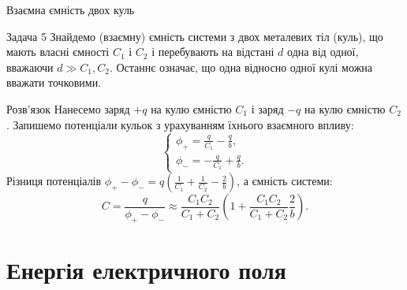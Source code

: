\documentclass[onlytextwidth]{beamer}
\begin{document}
\begin{frame}{Взаємна ємність двох куль}{}
	\begin{exampleblock}{\scriptsize Задача 5}\scriptsize\justifying
		Знайдемо (взаємну) ємність системи з двох металевих тіл (куль), що мають власні ємності
		$C_1$ і $C_2$ і перебувають на відстані $d$ одна від одної, вважаючи $d \gg C_1,C_2$.
		Останнє означає, що одна відносно одної кулі можна вважати точковими.
	\end{exampleblock}
	\begin{center}
	\end{center}
	\begin{block}{\scriptsize Розв'язок}\scriptsize\justifying
		Нанесемо заряд $+q$ на кулю ємністю $C_1$ і заряд $-q$ на кулю ємністю $C_2$. Запишемо
		потенціали кульок з урахуванням їхнього взаємного впливу:
		\begin{equation*}
			\begin{cases}
				\phi_+ = \frac{q}{C_1} - \frac{q}{b}, \\
				\phi_- = -\frac{q}{C_1} + \frac{q}{b}.
			\end{cases}
		\end{equation*}
		Різниця потенціалів $\phi_+ - \phi_- = q\left( \frac1{C_1} + \frac1{C_2} - \frac2b\right) $, а
		ємність системи:
		\begin{equation*}
			C = \frac{q}{\phi_+ - \phi_-} \approx \frac{C_1C_2}{C_1 + C_2} \left(1 + \frac{C_1C_2}{C_1 +
				C_2}\frac2{b} \right) .
		\end{equation*}
	\end{block}
\end{frame}


\section{Енергія електричного поля}
\end{document}
